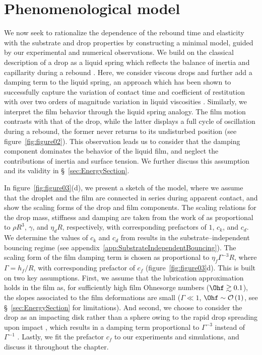 \section{Phenomenological model} \label{sec:Phenomenological_model}

We now seek to rationalize the dependence of the rebound time and elasticity with the substrate and drop properties by constructing a minimal model, guided by our experimental and numerical observations. We build on the classical description of a drop as a liquid spring which reflects the balance of inertia and capillarity during a rebound \citep{richard2002contact,okumura2003water}. Here, we consider viscous drops and further add a damping term to the liquid spring, an approach which has been shown to successfully capture the variation of contact time and coefficient of restitution with over two orders of magnitude variation in liquid viscosities \citep{jha2020viscous}. Similarly, we interpret the film behavior through the liquid spring analogy. The film motion contrasts with that of the drop, while the latter displays a full cycle of oscillation during a rebound, the former never returns to its undisturbed position (see figure~\ref{fig:figure02}). %
This observation leads us to consider that the damping component dominates the behavior of the liquid film, and neglect the contributions of inertia and surface tension. We further discuss this assumption and its validity in \S~\ref{sec:EnergySection}. 

In figure~\ref{fig:figure03}(d), we present a sketch of the model, where we assume that the droplet and the film are connected in series during apparent contact, and show the scaling forms of the drop and film components. The scaling relations for the drop mass, stiffness and damping are taken from the work of \citet{jha2020viscous} as proportional to $\rho R^3$, $\gamma$, and $\eta_d R$, respectively, with corresponding prefactors of $1$, $c_k$, and $c_d$. We determine the values of $c_k$ and $c_d$ from results in the substrate--independent bouncing regime (see appendix~\ref{app:SubstrateIndependentBouncing}). 
The scaling form of the film damping term is chosen as proportional to $\eta_{f} \Gamma^{-3} R$, where $\Gamma = h_f/R$, with corresponding prefactor of $c_{f}$ (figure~\ref{fig:figure03}d). This is built on two key assumptions. First, we assume that the lubrication approximation holds in the film as, for sufficiently high film Ohnesorge numbers ($\Ohf \gtrsim 0.1$), the slopes associated to the film deformations are small ($\Gamma \ll 1$, $\Ohf \sim \mathcal{O}\left(1\right)$, see \S~\ref{sec:EnergySection} for limitations). And second, we choose to consider the drop as an impacting disk rather than a sphere \citep{leal2007advanced} owing to the rapid drop spreading upon impact \citep{eggers2010drop, wildeman2016spreading}, which results in a damping term proportional to $\Gamma^{-3}$ instead of $\Gamma^{-1}$ \citep{leal2007advanced}. Lastly, we fit the prefactor $c_f$ to our experiments and simulations, and discuss it throughout the chapter.

